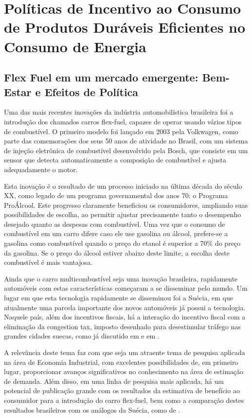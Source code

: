 \documentclass[
	12pt,				%
	openright,			%
	twoside,			%
	a4paper,			%
	english,			%
	french,				%
	spanish,			%
	brazil,				%
	]{abntex2}
\begin{document}
\section{Políticas de Incentivo ao Consumo de Produtos Duráveis Eficientes no Consumo de Energia}




\subsection*{Flex Fuel em um mercado emergente: Bem-Estar e Efeitos de Política}

Uma das mais recentes inovações da indústria automobilística brasileira foi a introdução dos chamados carros flex-fuel, capazes de operar usando vários tipos de combustível. O primeiro modelo foi lançado em 2003 pela Volkwagen, como parte das comemorações dos seus 50 anos de atividade no Brasil, com um sistema de injeção eletrônica de combustível desenvolvido pela Bosch, que consiste em um sensor que detecta automaticamente a composição de combustível e ajusta adequadamente o motor.

Esta inovação é o resultado de um processo iniciado na última década do século XX,  como legado de um programa governamental dos anos 70: o Programa ProÁlcool. Este progresso claramente beneficiou os consumidores, ampliando suas possibilidades de escolha, ao permitir ajustar precisamente tanto o desempenho desejado quanto as despesas com combustível. Uma vez que o consumo de combustível em um carro difere  caso ele use gasolina ou álcool, prefere-se a gasolina como combustível quando o preço do etanol é  superior a 70\% do preço da gasolina. Se o preço do álcool estiver abaixo deste limite, a escolha deste combustível é mais vantajosa.

Ainda que o carro multicombustível seja uma inovação brasileira, rapidamente automóveis com estas características começaram a se disseminar pelo mundo. Um lugar em que esta tecnologia rapidamente se disseminou foi a Suécia, em que atualmente uma parcela importante dos novos automóveis já possui a tecnologia. Naquele país, além dos incentivos fiscais, há a interação do incentivo fiscal com a eliminação da congestion tax, imposto desenhado para desestimular tráfego nas grandes cidades suecas, como já discutido em \cite{Huse2013} e em \cite{Eliasson2008}.

A relevância deste tema faz com que seja um atraente tema de pesquisa aplicada na área de Economia Industrial, com excelentes possibilidades de, em primeiro lugar, proporcionar avanços significativos no conhecimento na área de estimação de demanda. Além disso, em uma linha de pesquisa mais aplicada, há um potencial de publicação grande com os resultados da estimativa de benefício ao consumidor para a introdução do carro flex-fuel, bem como a comparação destes resultados brasileiros com os análogos da Suécia, como de \cite{Huse2013}.
\end{document}
